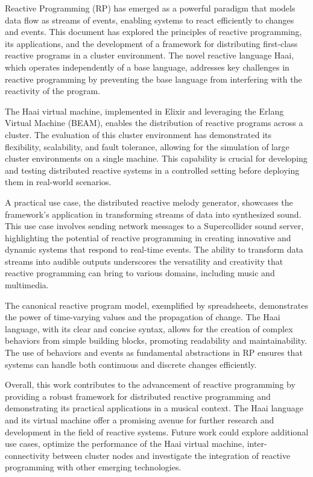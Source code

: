 \documentclass[a4paper]{book}
\begin{document}
Reactive Programming (RP) has emerged as a powerful paradigm that models data flow as streams of events, enabling systems to react efficiently to changes and events. This document has explored the principles of reactive programming, its applications, and the development of a framework for distributing first-class reactive programs in a cluster environment. The novel reactive language Haai, which operates independently of a base language, addresses key challenges in reactive programming by preventing the base language from interfering with the reactivity of the program.

The Haai virtual machine, implemented in Elixir and leveraging the Erlang Virtual Machine (BEAM), enables the distribution of reactive programs across a cluster. The evaluation of this cluster environment has demonstrated its flexibility, scalability, and fault tolerance, allowing for the simulation of large cluster environments on a single machine. This capability is crucial for developing and testing distributed reactive systems in a controlled setting before deploying them in real-world scenarios.

A practical use case, the distributed reactive melody generator, showcases the framework's application in transforming streams of data into synthesized sound. This use case involves sending network messages to a Supercollider sound server, highlighting the potential of reactive programming in creating innovative and dynamic systems that respond to real-time events. The ability to transform data streams into audible outputs underscores the versatility and creativity that reactive programming can bring to various domains, including music and multimedia.

The canonical reactive program model, exemplified by spreadsheets, demonstrates the power of time-varying values and the propagation of change. The Haai language, with its clear and concise syntax, allows for the creation of complex behaviors from simple building blocks, promoting readability and maintainability. The use of behaviors and events as fundamental abstractions in RP ensures that systems can handle both continuous and discrete changes efficiently.

Overall, this work contributes to the advancement of reactive programming by providing a robust framework for distributed reactive programming and demonstrating its practical applications in a musical context. The Haai language and its virtual machine offer a promising avenue for further research and development in the field of reactive systems. Future work could explore additional use cases, optimize the performance of the Haai virtual machine, inter-connectivity between cluster nodes and investigate the integration of reactive programming with other emerging technologies.

\printbibliography
\end{document}
